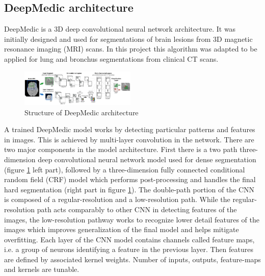 \subsection{DeepMedic architecture}\label{deepmedic_chapter}
DeepMedic is a 3D deep convolutional neural network architecture. It was initially designed and used for segmentations of brain lesions from 3D magnetic resonance imaging (MRI) scans. In this project this algorithm was adapted to be applied for lung and bronchus segmentations from clinical CT scans. \newline
\begin{figure}[h!]
	\includegraphics[width=0.49\textwidth, angle=0]{files/deepMedic.png}
	\caption{Structure of DeepMedic architecture}
	\label{deepmedic}
\end{figure}
 
A trained DeepMedic model works by detecting particular patterns and features in images. This is achieved by multi-layer convolution in the network. There are two major components in the model architecture. First there is a two path three-dimension deep convolutional neural network model used for dense segmentation (figure \ref{deepmedic} left part), followed by a three-dimension fully connected conditional random field (CRF) model which performs post-processing and handles the final hard segmentation (right part in figure \ref{deepmedic}). The double-path portion of the CNN is composed of a regular-resolution and a low-resolution path. While the regular-resolution path acts comparably to other CNN in detecting features of the images, the low-resolution pathway works to recognize lower detail features of the images which improves generalization of the final model and helps mitigate overfitting.
Each layer of the CNN model contains channels called feature maps, i.e. a group of neurons identifying a feature in the previous layer. Then features are defined by associated kernel weights. Number of inputs, outputs, feature-maps and kernels are tunable.

